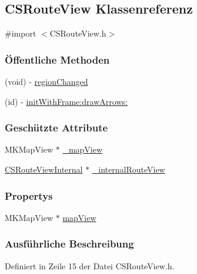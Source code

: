 \hypertarget{interface_c_s_route_view}{
\subsection{CSRouteView Klassenreferenz}
\label{interface_c_s_route_view}
}


{\ttfamily \#import $<$CSRouteView.h$>$}\subsubsection*{Öffentliche Methoden}
\begin{DoxyCompactItemize}
\item 
(void) -\/ \hyperlink{interface_c_s_route_view_a32f44e359ed911edd65611b02ae32208}{regionChanged}
\item 
(id) -\/ \hyperlink{interface_c_s_route_view_a12dc74e4cd6d4c33fa16abcf6c06e768}{initWithFrame:drawArrows:}
\end{DoxyCompactItemize}
\subsubsection*{Geschützte Attribute}
\begin{DoxyCompactItemize}
\item 
MKMapView $\ast$ \hyperlink{interface_c_s_route_view_a3178cd8d5a40441d57450b035e0ccb0b}{\_\-mapView}
\item 
\hyperlink{interface_c_s_route_view_internal}{CSRouteViewInternal} $\ast$ \hyperlink{interface_c_s_route_view_a92cd1128c9f172fff59f1eb3e4c674cf}{\_\-internalRouteView}
\end{DoxyCompactItemize}
\subsubsection*{Propertys}
\begin{DoxyCompactItemize}
\item 
MKMapView $\ast$ \hyperlink{interface_c_s_route_view_a52bb7d64fe9655c610dd8815851059a1}{mapView}
\end{DoxyCompactItemize}


\subsubsection{Ausführliche Beschreibung}


Definiert in Zeile 15 der Datei CSRouteView.h.

